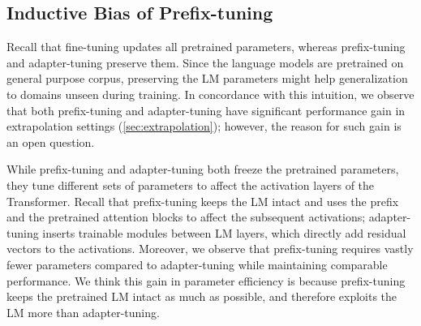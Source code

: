 \documentclass[11pt,a4paper]{article}
\newcommand\pl[1]{\textcolor{red}{[PL: #1]}}
\begin{document}

\subsection{Inductive Bias of Prefix-tuning}
Recall that fine-tuning updates all pretrained parameters, whereas prefix-tuning and adapter-tuning preserve them. Since the language models are pretrained on general purpose corpus, preserving the LM parameters might help generalization to domains unseen during training. In concordance with this intuition, we observe that both prefix-tuning and adapter-tuning have significant performance gain in extrapolation settings (\cref{sec:extrapolation}); however, the reason for such gain is an open question. 

While prefix-tuning and adapter-tuning both freeze the pretrained parameters, they tune different sets of parameters to affect the activation layers of the Transformer. Recall that prefix-tuning keeps the LM intact and uses the prefix and the pretrained attention blocks to affect the subsequent activations; adapter-tuning inserts trainable modules between LM layers, which directly add residual vectors to the activations. 
Moreover, we observe that prefix-tuning requires vastly fewer parameters compared to adapter-tuning while maintaining comparable performance. We think this gain in parameter efficiency is because prefix-tuning keeps the pretrained LM intact as much as possible, and therefore exploits the LM more than adapter-tuning.  

\end{document}
